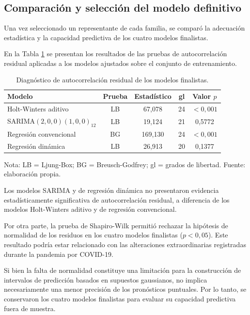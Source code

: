 \documentclass[12pt]{article}
\begin{document}
\subsection{Comparación y selección del modelo definitivo}

Una vez seleccionado un representante de cada familia, 
se comparó la adecuación estadística y la capacidad 
predictiva de los cuatro modelos finalistas.

En la Tabla \ref{tab:diagnostico} se presentan los 
resultados de las pruebas de autocorrelación residual 
aplicadas a los modelos ajustados sobre el conjunto 
de entrenamiento.

\begin{table}[H]
    \centering
    \caption{Diagnóstico de autocorrelación residual 
    de los modelos finalistas.}
    \label{tab:diagnostico}
    \begin{tabular}{lcccc}
        \hline
        Modelo & Prueba & Estadístico & gl & Valor $p$ \\
        \hline
        Holt-Winters aditivo & LB & 67,078 & 24 & $<0,001$ \\
        SARIMA$(2,0,0)(1,0,0)_{12}$ & LB & 19,124 & 21 & 0,5772 \\
        Regresión convencional & BG & 169,130 & 24 & $<0,001$ \\
        Regresión dinámica & LB & 26,913 & 20 & 0,1377 \\
        \hline
    \end{tabular}

    \begin{flushleft}
        \footnotesize
        Nota: LB = Ljung-Box; BG = Breusch-Godfrey;
        gl = grados de libertad.
        Fuente: elaboración propia.
    \end{flushleft}
\end{table}

Los modelos SARIMA y de regresión dinámica no 
presentaron evidencia estadísticamente significativa 
de autocorrelación residual, a diferencia de los modelos 
Holt-Winters aditivo y de regresión convencional. 

Por otra parte, la prueba de Shapiro-Wilk permitió 
rechazar la hipótesis de normalidad de los residuos 
en los cuatro modelos finalistas ($p<0,05$). Este 
resultado podría estar relacionado con las alteraciones 
extraordinarias registradas durante la pandemia por 
COVID-19.

Si bien la falta de normalidad constituye una limitación 
para la construcción de intervalos de predicción 
basados en supuestos gaussianos, no implica necesariamente 
una menor precisión de los pronósticos puntuales. Por 
lo tanto, se conservaron los cuatro modelos finalistas 
para evaluar su capacidad predictiva fuera de muestra.
\end{document}
